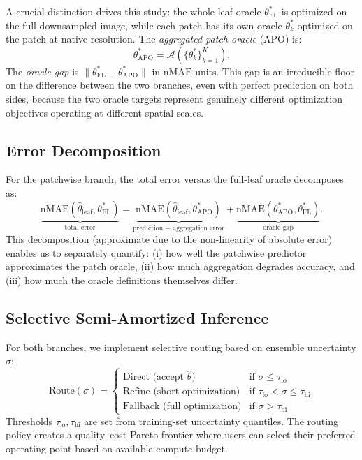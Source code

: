 \documentclass[11pt,a4paper]{article}
\newcommand{\thetastar}{\theta^{*}}
\newcommand{\thetahat}{\hat{\theta}}
\newcommand{\nMAE}{\mathrm{nMAE}}
\begin{document}
A crucial distinction drives this study: the whole-leaf oracle $\thetastar_\mathrm{FL}$ is optimized on the full downsampled image, while each patch has its own oracle $\thetastar_k$ optimized on the patch at native resolution.
The \emph{aggregated patch oracle} (APO) is:
\begin{equation}
\thetastar_\mathrm{APO} = \mathcal{A}(\{\thetastar_k\}_{k=1}^K).
\end{equation}
The \emph{oracle gap} is $\|\thetastar_\mathrm{FL} - \thetastar_\mathrm{APO}\|$ in $\nMAE$ units.
This gap is an irreducible floor on the difference between the two branches, even with perfect prediction on both sides, because the two oracle targets represent genuinely different optimization objectives operating at different spatial scales.

\subsection{Error Decomposition}

For the patchwise branch, the total error versus the full-leaf oracle decomposes as:
\begin{equation}
\underbrace{\nMAE(\thetahat_\mathrm{leaf}, \thetastar_\mathrm{FL})}_{\text{total error}} =
\underbrace{\nMAE(\thetahat_\mathrm{leaf}, \thetastar_\mathrm{APO})}_{\text{prediction + aggregation error}} +
\underbrace{\nMAE(\thetastar_\mathrm{APO}, \thetastar_\mathrm{FL})}_{\text{oracle gap}}.
\label{eq:decomposition}
\end{equation}
This decomposition (approximate due to the non-linearity of absolute error) enables us to separately quantify: (i) how well the patchwise predictor approximates the patch oracle, (ii) how much aggregation degrades accuracy, and (iii) how much the oracle definitions themselves differ.

\subsection{Selective Semi-Amortized Inference}

For both branches, we implement selective routing based on ensemble uncertainty $\sigma$:
\begin{equation}
\text{Route}(\sigma) = \begin{cases}
    \text{Direct (accept } \thetahat \text{)} & \text{if } \sigma \leq \tau_\mathrm{lo} \\
    \text{Refine (short optimization)} & \text{if } \tau_\mathrm{lo} < \sigma \leq \tau_\mathrm{hi} \\
    \text{Fallback (full optimization)} & \text{if } \sigma > \tau_\mathrm{hi}
\end{cases}
\end{equation}
Thresholds $\tau_\mathrm{lo}, \tau_\mathrm{hi}$ are set from training-set uncertainty quantiles.
The routing policy creates a quality--cost Pareto frontier where users can select their preferred operating point based on available compute budget.
\end{document}
